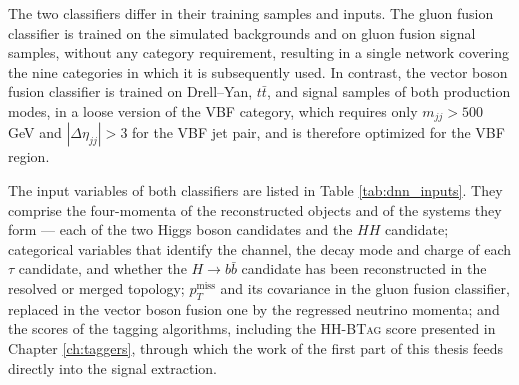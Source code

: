 The two classifiers differ in their training samples and inputs. The gluon fusion classifier is trained on the simulated backgrounds and on gluon fusion signal samples, without any category requirement, resulting in a single network covering the nine categories in which it is subsequently used. In contrast, the vector boson fusion classifier is trained on Drell--Yan, $t\bar{t}$, and signal samples of both production modes, in a loose version of the VBF category, which requires only $m_{jj} > 500$ GeV and $|\Delta \eta_{jj}| > 3$ for the VBF jet pair, and is therefore optimized for the VBF region.

The input variables of both classifiers are listed in Table \ref{tab:dnn_inputs}. They comprise the four-momenta of the reconstructed objects and of the systems they form — each of the two Higgs boson candidates and the $HH$ candidate; categorical variables that identify the channel, the decay mode and charge of each $\tau$ candidate, and whether the $H\to b\bar{b}$ candidate has been reconstructed in the resolved or merged topology; $p_T^\text{miss}$ and its covariance in the gluon fusion classifier, replaced in the vector boson fusion one by the regressed neutrino momenta; and the scores of the tagging algorithms, including the \textsc{HH-BTag} score presented in Chapter \ref{ch:taggers}, through which the work of the first part of this thesis feeds directly into the signal extraction. 
%
